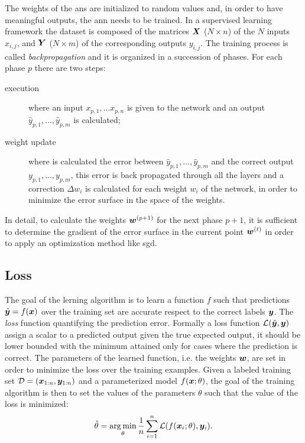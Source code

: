The weights of the \acp{an} are initialized to random values and, in order
to have meaningful outputs, the \ac{ann} needs to be trained. In a
supervised learning framework the dataset is composed of the matrices
$\bm{X}$ ($N\times n$) of the $N$ inputs $x_{i,j}$, and $\bm{Y}$
($N\times m$) of 
the corresponding outputs $y_{i,j}$. The
training process is called \emph{backpropagation} and it is organized in a
succession of phases. For each phase $p$ there are two steps:
\begin{description}
\item[execution] where an input $x_{p,1},\dots x_{p,n}$ is given to
  the network and an output $\hat{y}_{p,1},\dots,\hat{y}_{p,m}$ is calculated;
\item[weight update] where is calculated the error between
  $\hat{y}_{p,1},\dots,\hat{y}_{p,m}$ and the correct output
  $y_{p,1},\dots,y_{p,m}$, this error is back propagated through all
  the layers and a correction $\Delta w_i$ is calculated for each weight $w_i$ of
  the network, in
  order to minimize the error surface in the space of the weights.
\end{description}
In detail, to calculate the weights $\bm{w}^{(p+1)}$ for the next
phase $p+1$, it is 
sufficient to determine the gradient of 
the error surface in the current point $\bm{w}^{(t)}$ in order to
apply an optimization method like \ac{sgd}.

\subsection{Loss}
The goal of the lerning algorithm is to learn a function $f$ such that
predictions $\hat{\bm{y}}=f(\bm{x})$ over the training set are accurate respect
to the correct labels $\bm{y}$. The \emph{loss} function quantifying
the prediction error. Formally a loss function
$\mathcal{L}(\hat{\bm{y}},\bm{y})$ assign a scalar to a predicted output
given the true expected output, it should be lower bounded with the
minimum attained only for cases where the prediction is correct. The
parameters of the learned function, i.e. the weights $\bm{w}$, are
set in order to minimize the loss over the training examples. Given a
labeled training set $\mathcal{D}=(\bm{x}_{1:n},\bm{y}_{1:n})$ and a
parameterized model $f(\bm{x};\theta)$, the goal of the training
algorithm is then to set the values of the parameters $\theta$
such that the value of the loss is minimized:
\begin{equation}\label{eq:lossmin}
  \hat\theta=\operatorname*{arg\,min}_\theta\frac{1}{n}\sum_{i=1}^n\mathcal{L}(f(\bm{x}_i;\theta),\bm{y}_i).
\end{equation}

